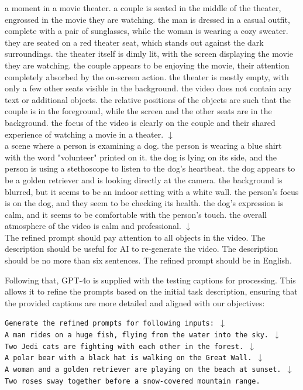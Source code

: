 {a moment in a movie theater. a couple is seated in the middle of the theater, engrossed in the movie they are watching. the man is dressed in a casual outfit, complete with a pair of sunglasses, while the woman is wearing a cozy sweater. they are seated on a red theater seat, which stands out against the dark surroundings. the theater itself is dimly lit, with the screen displaying the movie they are watching. the couple appears to be enjoying the movie, their attention completely absorbed by the on-screen action. the theater is mostly empty, with only a few other seats visible in the background. the video does not contain any text or additional objects. the relative positions of the objects are such that the couple is in the foreground, while the screen and the other seats are in the background. the focus of the video is clearly on the couple and their shared experience of watching a movie in a theater. $\downarrow$ \\
a scene where a person is examining a dog. the person is wearing a blue shirt with the word "volunteer" printed on it. the dog is lying on its side, and the person is using a stethoscope to listen to the dog's heartbeat. the dog appears to be a golden retriever and is looking directly at the camera. the background is blurred, but it seems to be an indoor setting with a white wall. the person's focus is on the dog, and they seem to be checking its health. the dog's expression is calm, and it seems to be comfortable with the person's touch. the overall atmosphere of the video is calm and professional. $\downarrow$ \\
The refined prompt should pay attention to all objects in the video. The description should be useful for AI to re-generate the video. The description should be no more than six sentences. The refined prompt should be in English.}

Following that, GPT-4o is supplied with the testing captions for processing. This allows it to refine the prompts based on the initial task description, ensuring that the provided captions are more detailed and aligned with our objectives:

\texttt{Generate the refined prompts for following inputs: $\downarrow$ \\
A man rides on a huge fish, flying from the water into the sky. $\downarrow$ \\
Two Jedi cats are fighting with each other in the forest. $\downarrow$  \\
A polar bear with a black hat is walking on the Great Wall. $\downarrow$  \\
A woman and a golden retriever are playing on the beach at sunset. $\downarrow$ \\
Two roses sway together before a snow-covered mountain range.
}

